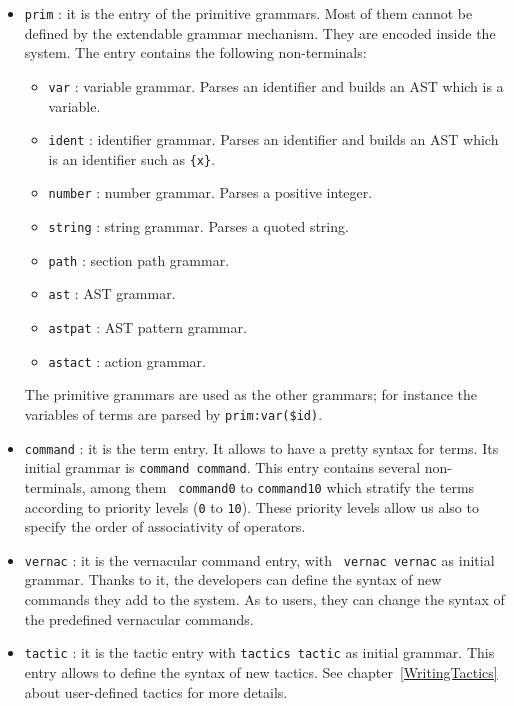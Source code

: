 \begin{itemize}
\item \verb+prim+ : it is the entry of the primitive grammars. Most of
  them cannot be defined by the extendable grammar mechanism. They are
  encoded inside the system. The entry contains the following
  non-terminals:

\begin{itemize}
\item \verb+var+ : variable grammar. Parses an identifier and builds
an AST which is a variable.
\item \verb+ident+ : identifier grammar. Parses an identifier and
builds an AST which is an identifier such as \verb+{x}+.
\item \verb+number+ : number grammar. Parses a positive integer.
\item \verb+string+ : string grammar. Parses a quoted string.
\item \verb+path+ : section path grammar.
\item \verb+ast+ : AST grammar.
\item \verb+astpat+ : AST pattern grammar.
\item \verb+astact+ : action grammar.
\end{itemize}

The primitive grammars are used as the other grammars; for instance
the variables of terms are parsed by \verb+prim:var($id)+.

\item \verb+command+ : it is the term entry. It allows to have a
  pretty syntax for terms. Its initial grammar is {\tt command
  command}. This entry contains several non-terminals, among them {\tt
  command0} to {\tt command10} which stratify the terms according to
  priority levels (\verb+0+ to \verb+10+). These priority levels allow
  us also to specify the order of associativity of operators.


\item \verb+vernac+ : it is the vernacular command entry, with {\tt
  vernac vernac} as initial grammar. Thanks to it, the developers can
  define the syntax of new commands they add to the system. As to
  users, they can change the syntax of the predefined vernacular
  commands.

\item \verb+tactic+ : it is the tactic entry with {\tt tactics tactic}
  as initial grammar. This entry allows to define the syntax of new
  tactics. See chapter~\ref{WritingTactics} about user-defined tactics
  for more details.

\end{itemize}

